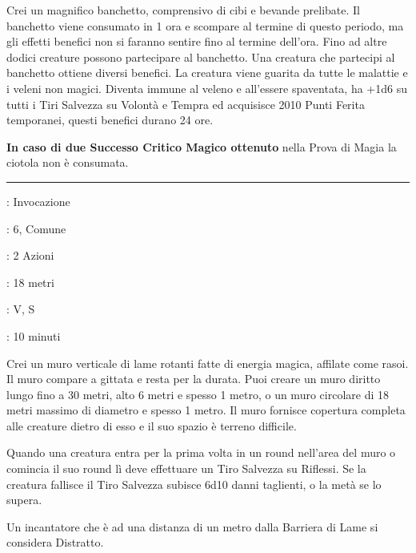 \begin{multicols}{2}
Crei un magnifico banchetto, comprensivo di cibi e bevande prelibate. Il banchetto viene consumato in 1 ora e scompare al termine di questo periodo, ma gli effetti benefici non si faranno sentire fino al termine dell'ora. Fino ad altre dodici creature possono
partecipare al banchetto. Una creatura che partecipi al banchetto ottiene diversi benefici. La creatura viene guarita da tutte le malattie e i veleni non magici. Diventa immune al veleno e all'essere spaventata, ha +1d6 su tutti i Tiri Salvezza su Volontà e Tempra ed acquisisce 2010 Punti Ferita temporanei, questi benefici durano 24 ore.

\textbf{In caso di due Successo Critico Magico ottenuto} nella Prova di Magia la ciotola non è consumata.

\smallskip\noindent\rule{\linewidth}{2pt} \hypertarget{Barriera di Lame}{}\medskip{}
\noindent
\begin{description}[noitemsep, topsep=0pt, parsep=0pt, partopsep=0pt, leftmargin=0cm, labelwidth=2.8cm]
	\item[\textbf{Lista di Magia}]: Invocazione
	\item[\textbf{Livello}]: 6, Comune
	\item[\textbf{T. di Lancio}]: 2 Azioni
	\item[\textbf{Gittata}]: 18 metri
	\item[\textbf{Componenti}]: V, S
	\item[\textbf{Durata}]: 10 minuti
\end{description}

Crei un muro verticale di lame rotanti fatte di energia magica, affilate come rasoi. Il muro compare a gittata e resta per la durata. Puoi creare un muro diritto lungo fino a 30 metri, alto 6 metri e spesso 1 metro, o un muro circolare di 18 metri massimo di diametro e spesso 1 metro. Il muro fornisce copertura completa alle creature dietro di esso e il suo spazio è terreno difficile.

Quando una creatura entra per la prima volta in un round nell'area del muro o comincia il suo round lì deve effettuare un Tiro Salvezza su Riflessi. Se la creatura fallisce il Tiro Salvezza subisce 6d10 danni taglienti, o la metà se lo supera.

Un incantatore che è ad una distanza di un metro dalla Barriera di Lame si considera Distratto.


\end{multicols}
